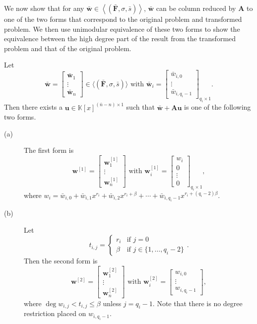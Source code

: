 We now show that for any $\bar{\mathbf{w}}\in\left\langle \left(\bar{\mathbf{F}},\sigma,\bar{s}\right)\right\rangle $,
$\bar{\mathbf{w}}$ can be column reduced by $\mathbf{A}$ to one
of the two forms that correspond to the original problem and transformed
problem. We then use unimodular equivalence of these two forms to
show the equivalence between the high degree part of the result from
the transformed problem and that of the original problem. 
\begin{lem}
Let \[
\bar{\mathbf{w}}=\begin{bmatrix}\bar{\mathbf{w}}_{1}\\
\vdots\\
\bar{\mathbf{w}}_{n}\end{bmatrix}\in\langle(\bar{\mathbf{F}},\sigma,\bar{s})\rangle\mbox{ with }\bar{\mathbf{w}}_{i}=\begin{bmatrix}\bar{w}_{i,0}\\
\vdots\\
\bar{w}_{i,q_{i}-1}\end{bmatrix}_{q_{i}\times1}.\]
 Then there exists a $\mathbf{u}\in\mathbb{K}\left[x\right]^{\left(\bar{n}-n\right)\times1}$
such that $\bar{\mathbf{w}}+\mathbf{A}\mathbf{u}$ is one of the following
two forms. 
\begin{description}
\item [{{(a)}}] The first form is \textup{\[
\mathbf{w}^{[1]}=\begin{bmatrix}\mathbf{w}_{1}^{[1]}\\
\vdots\\
\mathbf{w}_{n}^{[1]}\end{bmatrix}\mbox{ with }\mathbf{w}_{i}^{[1]}=\begin{bmatrix}w_{i}\\
0\\
\vdots\\
0\end{bmatrix}_{q_{i}\times1},\]
 } where \textup{$w_{i}=\bar{w}_{i,0}+\bar{w}_{i,1}x^{r_{i}}+\bar{w}_{i,2}x^{r_{i}+\beta}+\cdots+\bar{w}_{i,q_{i}-1}x^{r_{i}+(q_{i}-2)\beta}$.} 
\item [{{(b)}}] Let \[
t_{i,j}=\begin{cases}
r_{i} & \mbox{if }j=0\\
\beta & \mbox{if }j\in\{1,\dots,q_{i}-2\}\end{cases}.\]
 Then the second form is \[
\mathbf{w}^{[2]}=\begin{bmatrix}\mathbf{w}_{1}^{[2]}\\
\vdots\\
\mathbf{w}_{n}^{[2]}\end{bmatrix}\mbox{ with }\mathbf{w}_{i}^{[2]}=\begin{bmatrix}w_{i,0}\\
\vdots\\
w_{i,q_{i}-1}\end{bmatrix},\]
 where $\deg w_{i,j}<t_{i,j}\le\beta$ unless $j=q_{i}-1$. Note that
there is no degree restriction placed on $w_{i,q_{i}-1}$. 
\end{description}
\end{lem}
